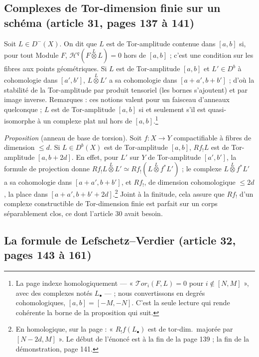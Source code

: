 \documentclass[11pt,a4paper]{article}
\begin{document}
\subsection*{Complexes de Tor-dimension finie sur un schéma (article 31, pages 137 à 141)}

Soit $L \in D^{-}(X)$. On dit que $L$ est de Tor-amplitude contenue dans
$[a, b]$ si, pour tout Module $F$, $\mathcal{H}^{q}(F \overset{L}{\otimes} L) =
0$ hors de $[a, b]$ ; c'est une condition sur les fibres aux points géométriques.
Si $L$ est de Tor-amplitude $[a, b]$ et $L' \in D^{b}$ à cohomologie dans $[a',
b']$, $L \overset{L}{\otimes} L'$ a sa cohomologie dans $[a + a', b + b']$ ; d'où
la stabilité de la Tor-amplitude par produit tensoriel (les bornes s'ajoutent)
et par image inverse. Remarques : ces notions valent pour un faisceau d'anneaux
quelconque ; $L$ est de Tor-amplitude $[a, b]$ si et seulement s'il est
quasi-isomorphe à un complexe plat nul hors de $[a, b]$.\footnote{La page
indexe homologiquement --- « $\mathcal{T}or_{i}(F, L) = 0$ pour $i \notin [N,
M]$ », avec des complexes notés $L_{\bullet}$ --- ; nous convertissons en degrés
cohomologiques, $[a, b] = [-M, -N]$. C'est la seule lecture qui rende cohérente
la borne de la proposition qui suit.}

\emph{Proposition} (anneau de base de torsion). Soit $f : X \to Y$
compactifiable à fibres de dimension $\leq d$. Si $L \in D^{b}(X)$ est de
Tor-amplitude $[a, b]$, $Rf_{!}L$ est de Tor-amplitude $[a, b + 2d]$. En effet,
pour $L'$ sur $Y$ de Tor-amplitude $[a', b']$, la formule de projection donne
$Rf_{!}L \overset{L}{\otimes} L' \simeq Rf_{!}(L \overset{L}{\otimes} f^{*}L')$ ;
le complexe $L \overset{L}{\otimes} f^{*}L'$ a sa cohomologie dans $[a + a', b +
b']$, et $Rf_{!}$, de dimension cohomologique $\leq 2d$, la place dans $[a + a',
b + b' + 2d]$.\footnote{En homologique, sur la page : « $R_{!}f(L_{\bullet})$
est de tor-dim.\ majorée par $[N-2d, M]$ ». Le début de l'énoncé est à la fin de
la page 139 ; la fin de la démonstration, page 141.} Joint à la finitude, cela
assure que $Rf_{!}$ d'un complexe constructible de Tor-dimension finie est
parfait sur un corps séparablement clos, ce dont l'article 30 avait besoin.

\subsection*{La formule de Lefschetz--Verdier (article 32, pages 143 à 161)}
\end{document}
